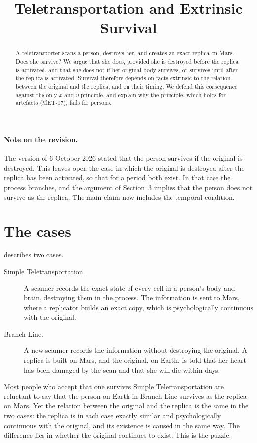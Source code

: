 \documentclass{situationist-preprint}
\title{Teletransportation and Extrinsic Survival}
\begin{document}
\maketitle

\begin{abstract}
A teletransporter scans a person, destroys her, and creates an exact replica on Mars. Does she survive? We argue that she does, provided she is destroyed before the replica is activated, and that she does not if her original body survives, or survives until after the replica is activated. Survival therefore depends on facts extrinsic to the relation between the original and the replica, and on their timing. We defend this consequence against the only-$x$-and-$y$ principle, and explain why the principle, which holds for artefacts (MET-07), fails for persons.
\end{abstract}

\paragraph{Note on the revision.} The version of 6 October 2026 stated that the person survives if the original is destroyed. This leaves open the case in which the original is destroyed after the replica has been activated, so that for a period both exist. In that case the process branches, and the argument of Section~3 implies that the person does not survive as the replica. The main claim now includes the temporal condition.

\section{The cases}

\citet[ch.~10]{Parfit1984} describes two cases.
\begin{description}
\item[Simple Teletransportation.] A scanner records the exact state of every cell in a person's body and brain, destroying them in the process. The information is sent to Mars, where a replicator builds an exact copy, which is psychologically continuous with the original.
\item[Branch-Line.] A new scanner records the information without destroying the original. A replica is built on Mars, and the original, on Earth, is told that her heart has been damaged by the scan and that she will die within days.
\end{description}

Most people who accept that one survives Simple Teletransportation are reluctant to say that the person on Earth in Branch-Line survives as the replica on Mars. Yet the relation between the original and the replica is the same in the two cases: the replica is in each case exactly similar and psychologically continuous with the original, and its existence is caused in the same way. The difference lies in whether the original continues to exist. This is the puzzle.
\end{document}
